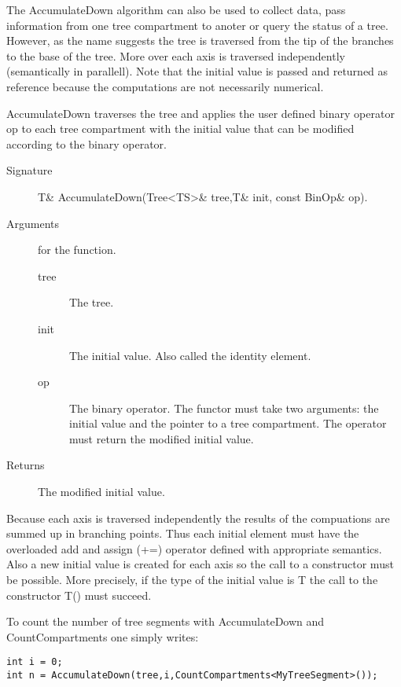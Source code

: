 The AccumulateDown  algorithm can also  be used to collect  data, pass
information from one tree compartment to anoter or query the status of
a tree.  However, as the name  suggests the tree is traversed from the
tip of the branches  to the base of the tree.  More  over each axis is
traversed  independently (semantically in  parallell).  Note  that the
initial  value  is  passed  and  returned  as  reference  because  the
computations are not necessarily numerical.

AccumulateDown traverses the tree and  applies the user defined binary
operator op  to each tree compartment  with the initial value that can
be modified according to the binary operator.

\begin{description}
   \item [Signature] T\& AccumulateDown(Tree<TS>\& tree,T\& init, const BinOp\& op).
   \item [Arguments] for the function.
     \begin{description}
        \item [tree] The tree.
        \item [init] The initial value. Also called the identity
     element.
        \item [op] The binary operator. The functor must take two
     arguments: the initial value and the pointer to a tree compartment. The
     operator must return the modified initial value.
     \end{description} 
   \item[Returns] The  modified initial value.
\end{description} 

Because  each axis is   traversed   independently the results of   the
compuations  are  summed up in  branching   points.  Thus each initial
element must have the overloaded add and  assign (+=) operator defined
with  appropriate semantics. Also a  new initial  value is created for
each  axis  so  the call to   a  constructor  must  be  possible. More
precisely, if  the type of   the initial value  is  T the call to  the
constructor T() must succeed.

To  count  the   number of   tree  segments  with  AccumulateDown  and
CountCompartments one simply writes:

\begin{verbatim}
int i = 0;
int n = AccumulateDown(tree,i,CountCompartments<MyTreeSegment>());
\end{verbatim}

